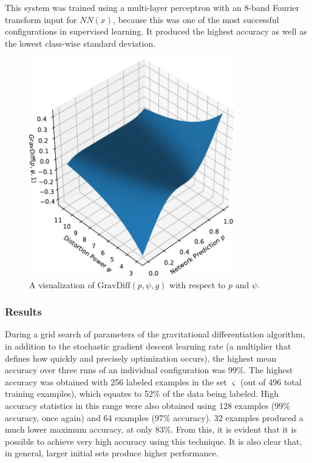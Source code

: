 \documentclass[10pt]{article}
\begin{document}
This system was trained using a multi-layer perceptron with an 8-band Fourier transform input for $NN(x)$, because this was one of the most successful configurations in supervised learning. It produced the highest accuracy as well as the lowest class-wise standard deviation.

\begin{figure}[H]
    \centering
    \includegraphics[width=0.8\textwidth]{grav_diff}
    \caption{\label{grav_diff} A visualization of $\mathrm{GravDiff}(p, \psi, g)$ with respect to $p$ and $\psi$.}
\end{figure}

\subsubsection{Results}

During a grid search of parameters of the gravitational differentiation algorithm, in addition to the stochastic gradient descent learning rate (a multiplier that defines how quickly and precisely optimization occurs), the highest mean accuracy over three runs of an individual configuration was 99\%. The highest accuracy was obtained with 256 labeled examples in the set $\varsigma$ (out of 496 total training examples), which equates to 52\% of the data being labeled. High accuracy statistics in this range were also obtained using 128 examples (99\% accuracy, once again) and 64 examples (97\% accuracy). 32 examples produced a much lower maximum accuracy, at only 83\%. From this, it is evident that it is possible to achieve very high accuracy using this technique. It is also clear that, in general, larger initial sets produce higher performance.
\end{document}
